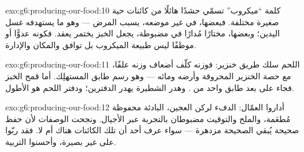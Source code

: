 \begin{solution}{exo:g6:producing-our-food:10}
كلمة ``ميكروب'' تسمّي حشدًا هائلًا من كائنات حية صغيرة مختلفة.
فبعضها، في غير موضعه، يسبب المرض --- وهو ما يستهدفه غسل اليدين؛
وبعضها، مختارًا مُدارًا في  مضبوطة، يجعل الخبز يختمر 
يعقد. فكونه عدوًّا أو موظفًا ليس طبيعة الميكروب بل توافق 
والمكان والإدارة.
\end{solution}

\begin{solution}{exo:g6:producing-our-food:11}
اللحم سلك طريق خنزير: فوزنه كلّف أضعاف وزنه علفًا، مع حصة الخنزير
المحروقة وأرضه ومائه --- وهو رسم طابق المستهلِك. أما قمح الخبز
فجاء على بعد طابق واحد من . وهدر الشطيرة يهدر الدفترين؛ ودفتر
اللحم هو الأطول.
\end{solution}

\begin{solution}{exo:g6:producing-our-food:12}
أداروا \emph{} العمّال: الدفء لركن العجين،  البادئة
محفوظة مُطعَمة، والملح والتوقيت مضبوطان بالتجربة عبر الأجيال. ونجحت
الوصفات لأن حفظ  صحيحة يُبقي  الصحيحة مزدهرة
--- سواء عرف أحد أن تلك الكائنات هناك أم لا. فقد ربّوا 
على غير بصيرة، وأحسنوا التربية.
\end{solution}

